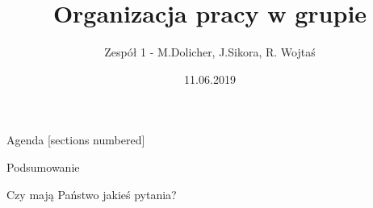 \documentclass[12pt]{beamer}
\title{Organizacja pracy w grupie}
\date{11.06.2019}
\author{Zespół 1 - M.Dolicher, J.Sikora, R. Wojtaś}
\institute{Projektowanie układów sterowania (projekt grupowy) - edycja 19L}
\begin{document}
\maketitle

\begin{frame}{Agenda}
  [sections numbered]
  \tableofcontents[hideallsubsections]
\end{frame}






\begin{frame}
  \begin{center}
    \Huge Podsumowanie
  \end{center}
\end{frame}

\begin{frame}
  \begin{center}
    \Huge Czy mają Państwo jakieś pytania?
  \end{center}
\end{frame}
\end{document}
